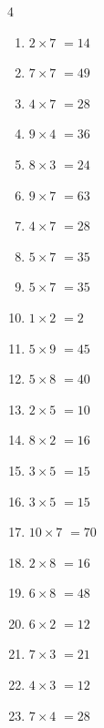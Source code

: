 \begin{multicols}{4}
\begin{enumerate}
  \item $2\times 7$
        $=14$

  \item $7\times 7$
        $=49$

  \item $4\times 7$
        $=28$

  \item $9\times 4$
        $=36$

  \item $8\times 3$
        $=24$

  \item $9\times 7$
        $=63$

  \item $4\times 7$
        $=28$

  \item $5\times 7$
        $=35$

  \item $5\times 7$
        $=35$

  \item $1\times 2$
        $=2$

  \item $5\times 9$
        $=45$

  \item $5\times 8$
        $=40$

  \item $2\times 5$
        $=10$

  \item $8\times 2$
        $=16$

  \item $3\times 5$
        $=15$

  \item $3\times 5$
        $=15$

  \item $10\times 7$
        $=70$

  \item $2\times 8$
        $=16$

  \item $6\times 8$
        $=48$

  \item $6\times 2$
        $=12$

  \item $7\times 3$
        $=21$

  \item $4\times 3$
        $=12$

  \item $7\times 4$
        $=28$


\end{enumerate}
\end{multicols}
